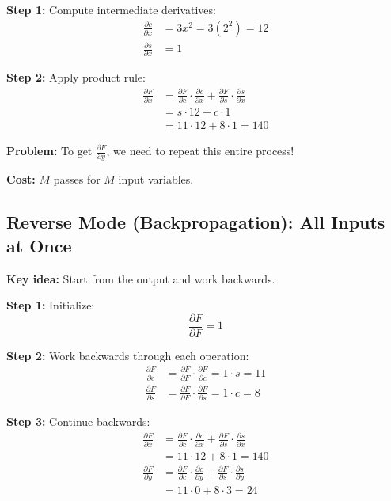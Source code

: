 \documentclass[11pt]{article}
\begin{document}
\textbf{Step 1:} Compute intermediate derivatives:
\begin{align}
\frac{\partial c}{\partial x} &= 3x^2 = 3(2^2) = 12\\
\frac{\partial s}{\partial x} &= 1
\end{align}

\textbf{Step 2:} Apply product rule:
\begin{align}
\frac{\partial F}{\partial x} &= \frac{\partial F}{\partial c} \cdot \frac{\partial c}{\partial x} + \frac{\partial F}{\partial s} \cdot \frac{\partial s}{\partial x}\\
&= s \cdot 12 + c \cdot 1\\
&= 11 \cdot 12 + 8 \cdot 1 = 140
\end{align}

\textbf{Problem:} To get $\frac{\partial F}{\partial y}$, we need to repeat this entire process!

\textbf{Cost:} $M$ passes for $M$ input variables.

\subsection{Reverse Mode (Backpropagation): All Inputs at Once}
\textbf{Key idea:} Start from the output and work backwards.

\textbf{Step 1:} Initialize:
\begin{equation}
\frac{\partial F}{\partial F} = 1
\end{equation}

\textbf{Step 2:} Work backwards through each operation:
\begin{align}
\frac{\partial F}{\partial c} &= \frac{\partial F}{\partial F} \cdot \frac{\partial F}{\partial c} = 1 \cdot s = 11\\
\frac{\partial F}{\partial s} &= \frac{\partial F}{\partial F} \cdot \frac{\partial F}{\partial s} = 1 \cdot c = 8
\end{align}

\textbf{Step 3:} Continue backwards:
\begin{align}
\frac{\partial F}{\partial x} &= \frac{\partial F}{\partial c} \cdot \frac{\partial c}{\partial x} + \frac{\partial F}{\partial s} \cdot \frac{\partial s}{\partial x}\\
&= 11 \cdot 12 + 8 \cdot 1 = 140\\
\frac{\partial F}{\partial y} &= \frac{\partial F}{\partial c} \cdot \frac{\partial c}{\partial y} + \frac{\partial F}{\partial s} \cdot \frac{\partial s}{\partial y}\\
&= 11 \cdot 0 + 8 \cdot 3 = 24
\end{align}
\end{document}

